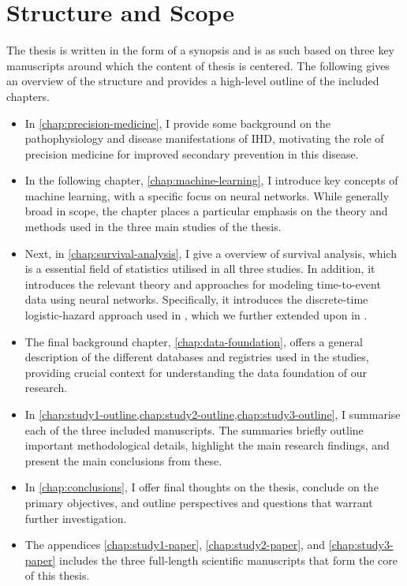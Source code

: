 \newpage
\section*{Structure and Scope}

The thesis is written in the form of a synopsis 
and is as such based on three key manuscripts around 
which the content of thesis is centered.
The following gives an overview of the structure and 
provides a high-level outline of the included chapters.

\begin{itemize} 
    \item In \autoref{chap:precision-medicine},
        I provide some background on the pathophysiology and disease
        manifestations of \ac{IHD}, 
        motivating the role of precision medicine for 
        improved secondary prevention in this disease.

    \item In the following chapter, \autoref{chap:machine-learning}, 
        I introduce key concepts of machine learning, 
        with a specific focus on neural networks. 
        While generally broad in scope, the chapter places a particular 
        emphasis on the theory and methods 
        used in the three main studies of the thesis.

    \item Next, in \autoref{chap:survival-analysis}, I give a
        overview of survival analysis, which is a essential field
        of statistics utilised in all three studies.
        In addition, it introduces the relevant theory
        and approaches for modeling time-to-event data
        using neural networks. 
        Specifically, it introduces the 
        discrete-time logistic-hazard approach used in \studyii{},
        which we further extended upon in \studyiii{}.

    \item The final background chapter,
        \autoref{chap:data-foundation}, offers a general description of 
        the different databases and registries used in the studies,
        providing crucial context for understanding the data foundation 
        of our research.

    \item In \cref{chap:study1-outline,chap:study2-outline,chap:study3-outline},
        I summarise each of the three included manuscripts.
        The summaries briefly outline important methodological details,
        highlight the main research findings, and present the main
        conclusions from these.

    \item In \cref{chap:conclusions}, I offer final thoughts on the thesis,
        conclude on the primary objectives, 
        and outline perspectives and questions
        that warrant further investigation.

    \item The appendices 
        \cref{chap:study1-paper}, 
        \cref{chap:study2-paper}, and
        \cref{chap:study3-paper} 
        includes the three full-length scientific
        manuscripts that form the core of this thesis.
\end{itemize}

